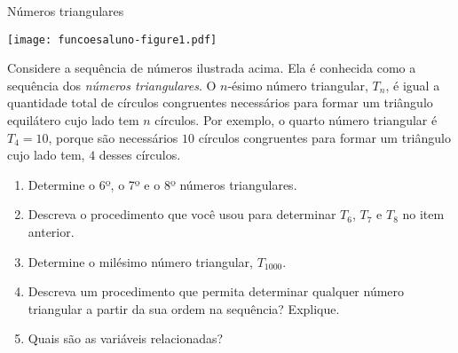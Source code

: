 \documentclass[extrafontsizes, twoside, 11pt, openright, final]{memoir}
\begin{document}
\begin{task}{ Números triangulares}
	\label{numeros-triangulares-funcoes}
	\begin{center}
		\texttt{[image: funcoesaluno-figure1.pdf]}
	\end{center}


	Considere a sequência de números ilustrada acima. Ela é conhecida como a sequência dos \emph{números triangulares}. O $n$-ésimo número triangular, $T_n$, é igual a quantidade total de círculos congruentes necessários para formar um triângulo equilátero cujo lado tem $n$ círculos. Por exemplo, o quarto número triangular é $T_4=10$, porque são necessários $10$ círculos congruentes para formar um triângulo cujo lado tem, $4$ desses círculos.
	\begin{enumerate}
		\item Determine o 6º, o 7º e o 8º números triangulares.

		\item Descreva o procedimento que você usou para determinar $T_6$, $T_7$ e $T_8$ no item anterior.

		\item Determine o milésimo número triangular, $T_{1000}$.

		\item Descreva um procedimento que permita determinar qualquer número triangular a partir da sua ordem na sequência? Explique.

		\item Quais são as variáveis relacionadas?

	\end{enumerate}
\end{task}
\end{document}
